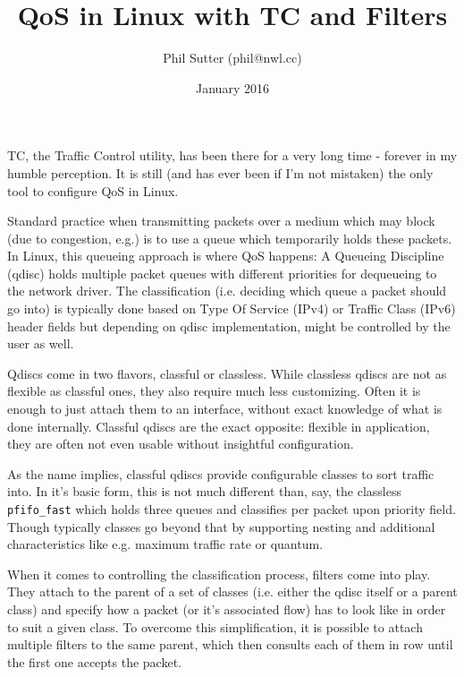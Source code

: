 \documentclass[12pt,twoside]{article}
\newcommand{\qdisc}{\texttt}
\begin{document}
\title{QoS in Linux with TC and Filters}
\author{Phil Sutter (phil@nwl.cc)}
\date{January 2016}
\maketitle

TC, the Traffic Control utility, has been there for a very long time - forever
in my humble perception. It is still (and has ever been if I'm not mistaken) the
only tool to configure QoS in Linux.

Standard practice when transmitting packets over a medium which may block (due
to congestion, e.g.) is to use a queue which temporarily holds these packets. In
Linux, this queueing approach is where QoS happens: A Queueing Discipline
(qdisc) holds multiple packet queues with different priorities for dequeueing to
the network driver. The classification (i.e. deciding which queue a packet
should go into) is typically done based on Type Of Service (IPv4) or Traffic
Class (IPv6) header fields but depending on qdisc implementation, might be
controlled by the user as well.

Qdiscs come in two flavors, classful or classless. While classless qdiscs are
not as flexible as classful ones, they also require much less customizing. Often
it is enough to just attach them to an interface, without exact knowledge of
what is done internally. Classful qdiscs are the exact opposite: flexible in
application, they are often not even usable without insightful configuration.

As the name implies, classful qdiscs provide configurable classes to sort
traffic into. In it's basic form, this is not much different than, say, the
classless \qdisc{pfifo\_fast} which holds three queues and classifies per
packet upon priority field. Though typically classes go beyond that by
supporting nesting and additional characteristics like e.g. maximum traffic
rate or quantum.

When it comes to controlling the classification process, filters come into play.
They attach to the parent of a set of classes (i.e. either the qdisc itself or
a parent class) and specify how a packet (or it's associated flow) has to look
like in order to suit a given class. To overcome this simplification, it is
possible to attach multiple filters to the same parent, which then consults each
of them in row until the first one accepts the packet.
\end{document}
